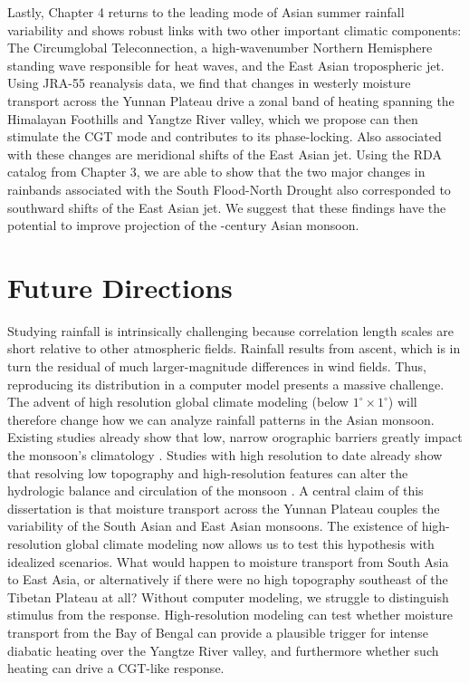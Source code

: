 	Lastly, Chapter 4 returns to the leading mode of Asian summer rainfall variability and shows robust links with two other important climatic components: The Circumglobal Teleconnection, a high-wavenumber Northern Hemisphere standing wave responsible for heat waves, and the East Asian tropospheric jet. Using JRA-55 reanalysis data, we find that changes in westerly moisture transport across the Yunnan Plateau drive a zonal band of heating spanning the Himalayan Foothills and Yangtze River valley, which we propose can then stimulate the CGT mode and contributes to its phase-locking. Also associated with these changes are meridional shifts of the East Asian jet. Using the RDA catalog from Chapter 3, we are able to show that the two major changes in rainbands associated with the South Flood-North Drought also corresponded to southward shifts of the East Asian jet. We suggest that these findings have the potential to improve projection of the -century Asian monsoon. 

\section{Future Directions}

	Studying rainfall is intrinsically challenging because correlation length scales are short relative to other atmospheric fields. Rainfall results from ascent, which is in turn the residual of much larger-magnitude differences in wind fields. Thus, reproducing its distribution in a computer model presents a massive challenge. The advent of high resolution global climate modeling (below $1^{\circ} \times 1^{\circ}$) will therefore change how we can analyze rainfall patterns in the  Asian monsoon. Existing studies already show that low, narrow orographic barriers greatly impact the monsoon's climatology \citep{Xie2006}. Studies with high resolution to date already show that resolving low topography and high-resolution features can alter the hydrologic balance and circulation of the monsoon \citep{Risi2010,Boos2013a,Wu2014a,Wu2016}. A central claim of this dissertation is that moisture transport across the Yunnan Plateau couples the variability of the South Asian and East Asian monsoons. The existence of high-resolution global climate modeling now allows us to test this hypothesis with idealized scenarios. What would happen to moisture transport from South Asia to East Asia, or alternatively if there were no high topography southeast of the Tibetan Plateau at all? Without computer modeling, we struggle to distinguish stimulus from the response. High-resolution modeling can test whether moisture transport from the Bay of Bengal can provide a plausible trigger for intense diabatic heating over the Yangtze River valley, and furthermore whether such heating can drive a CGT-like response.
		
